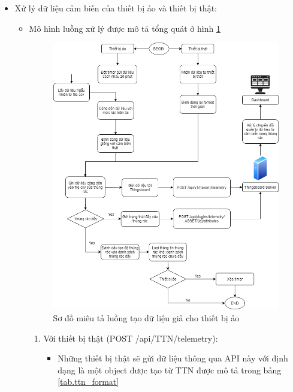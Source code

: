 \begin{itemize}
    \item Xử lý dữ liệu cảm biến của thiết bị ảo và thiết bị thật:
    \begin{itemize}  
        \item Mô hình luồng xử lý được mô tả tổng quát ở hình \ref{fig:random_telemetry}
        \begin{figure}[H]
            \centering
            \includegraphics[width=\textwidth]{images/Khanh/Nodejs/Server_Random_Telemetry.png}
            \caption{Sơ đồ miêu tả luồng tạo dữ liệu giả cho thiết bị ảo}
            \label{fig:random_telemetry}
        \end{figure}   
        \begin{enumerate}
            \item Với thiết bị thật (POST /api/TTN/telemetry): 
            \begin{itemize}
                \item Những thiết bị thật sẽ gửi dữ liệu thông qua API này với định dạng là một object được tạo từ TTN được mô tả trong bảng \ref{tab.ttn_format}
                \begin{table}[H]
                    \centering

\end{table}
\end{itemize}
\end{enumerate}
\end{itemize}
\end{itemize}
